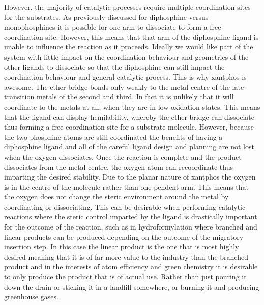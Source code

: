 However, the majority of catalytic processes require multiple coordination sites for the substrates.  As previously discussed for diphosphine versus monophosphines it is possible for one arm to dissociate to form a free coordination site.  However, this means that that arm of the diphosphine ligand is unable to influence the reaction as it proceeds.  Ideally we would like part of the system with little impact on the coordination behaviour and geometries of the other ligands to dissociate so that the diphosphine can still impact the coordination behaviour and general catalytic process.  This is why xantphos is awesome.   The ether bridge bonds only weakly to the metal centre of the late-transition metals of the second and third.  In fact it is unlikely that it will coordinate to the metals at all, when they are in low oxidation states.  This means that the ligand can display hemilability, whereby the ether bridge can dissociate thus forming a free coordination site for a substrate molecule.  However, because the two phosphine atoms are still coordinated the benefits of having a diphosphine ligand and all of the careful ligand design and planning are not lost when the oxygen dissociates.  Once the reaction is complete and the product dissociates from the metal centre, the oxygen atom can recoordinate thus imparting the desired stability.  Due to the planar nature of xantphos the oxygen is in the centre of the molecule rather than one pendent arm. This means that the oxygen does not change the steric environment around the metal by coordinating or dissociating.  This can be desirable when performing catalytic reactions where the steric control imparted by the ligand is drastically important for the outcome of the reaction, such as in hydroformylation where branched and linear products can be produced depending on the outcome of the migratory insertion step.  In this case the linear product is the one that is most highly desired meaning that it is of far more value to the industry than the branched product and in the interests of atom efficiency and green chemistry it is desirable to only produce the product that is of actual use.  Rather than just pouring it down the drain or sticking it in a landfill somewhere, or burning it and producing greenhouse gases.  


